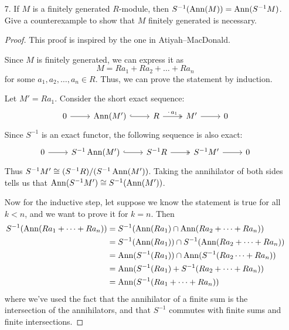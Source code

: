 \begin{exercise}
\begin{enumerate}
\begin{comment}
        By the definition of the colon ideal, we know that
        \[
            \frac{a}{s} \cdot S^{-1} J \subseteq S^{-1} I
        \]
        i.e. \(\forall b \in S^{-1} J\), \(\exists c \in S^{-1} I\) such that
        \[
            \frac{a}{s} \cdot \frac{b}{t} = \frac{c}{u}
        \]
    \end{itemize}
    \end{proof}
    \end{comment}
    
    \item[7.] If \(M\) is a finitely generated \(R\)-module, then \(S^{-1} (\operatorname{Ann}(M)) = \operatorname{Ann}(S^{-1} M)\). Give a counterexample to show that \(M\) finitely generated is necessary.
    
    \begin{proof}
    This proof is inspired by the one in Atiyah--MacDonald.
    
    Since \(M\) is finitely generated, we can express it as
    \[
        M = R a_1 + R a_2 + \dots + R a_n
    \]
    for some \(a_1, a_2, \dots, a_n \in R\). Thus, we can prove the statement by induction.
    
    Let \(M' = R a_1\). Consider the short exact sequence:
    \[
        \begin{tikzcd}
            0 \arrow[r] & \Ann(M') \arrow[hookrightarrow, r] & R \arrow[twoheadrightarrow, r, "\cdot \, a_1"] & M' \arrow[r] & 0
        \end{tikzcd}
    \]
    Since \(S^{-1}\) is an exact functor, the following sequence is also exact:
    \[
        \begin{tikzcd}
            0 \arrow[r] & S^{-1} \Ann(M') \arrow[hookrightarrow, r] & S^{-1} R \arrow[twoheadrightarrow, r] & S^{-1} M' \arrow[r] & 0
        \end{tikzcd}
    \]
    Thus \(S^{-1} M' \cong (S^{-1}R) / (S^{-1} \operatorname{Ann} (M'))\). Taking the annihilator of both sides tells us that \(\operatorname{Ann} (S^{-1} M') \cong S^{-1} (\operatorname{Ann}(M'))\).

    Now for the inductive step, let suppose we know the statement is true for all \(k < n\), and we want to prove it for \(k = n\). Then
    \begin{align*}
        S^{-1} (\operatorname{Ann}(R a_1 + \dots + R a_n)) &= S^{-1} (\operatorname{Ann}(R a_1) \cap \operatorname{Ann}(R a_2 + \dots + R a_n)) \\
        &= S^{-1} (\operatorname{Ann}(R a_1)) \cap S^{-1} (\operatorname{Ann}(R a_2 + \dots + R a_n)) \\
        &= \operatorname{Ann} (S^{-1} (R a_1)) \cap \operatorname{Ann}(S^{-1} (R a_2 \dots + R a_n)) \\
        &= \operatorname{Ann} (S^{-1} (R a_1) + S^{-1} (R a_2 + \dots + R a_n)) \\
        &= \operatorname{Ann} (S^{-1} (R a_1 + \dots + R a_n))
    \end{align*}
    where we've used the fact that the annihilator of a finite sum is the intersection of the annihilators, and that \(S^{-1}\) commutes with finite sums and finite intersections.
    

\end{proof}
\end{enumerate}
\end{exercise}
